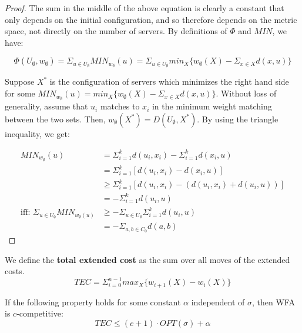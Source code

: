 \begin{proof}
    The sum in the middle of the above equation is clearly a constant that only depends on the initial configuration, and so therefore depends on the metric space, not directly on the number of servers. By definitions of $\Phi$ and $MIN$, we have:

    \begin{equation*}
        \Phi(U_\emptyset, w_\emptyset) = \Sigma_{u \in U_\emptyset} MIN_{w_\emptyset}(u) = \Sigma_{u \in U_\emptyset} min_X \{ w_\emptyset(X) - \Sigma_{x \in X} d(x, u)\}
    \end{equation*}

    Suppose $X^*$ is the configuration of servers which minimizes the right hand side for some $MIN_{w_\emptyset}(u) = min_X \{ w_\emptyset(X) - \Sigma_{x \in X} d(x, u)\}$. Without loss of generality, assume that $u_i$ matches to $x_i$ in the minimum weight matching between the two sets. Then, $w_\emptyset(X^*) = D(U_\emptyset, X^*)$. By using the triangle inequality, we get:

    \begin{equation*}
        \begin{split}
            MIN_{w_\emptyset}(u) &= \Sigma_{i=1}^k d(u_i, x_i) - \Sigma_{i=1}^k d(x_i , u) \\
            &= \Sigma_{i=1}^k [d(u_i, x_i) - d(x_i, u)] \\
            &\geq \Sigma_{i=1}^k [d(u_i, x_i) - (d(u_i, x_i) + d(u_i, u))] \\
            &= - \Sigma_{i=1}^k d(u_i, u) \\
            \text{iff: }\Sigma_{u \in U_\emptyset} MIN_{w_\emptyset(u)} &\geq -\Sigma_{u \in U_\emptyset} \Sigma_{i=1}^k d(u_i, u) \\
            &= - \Sigma_{a, b \in C_0} d(a, b)
        \end{split}
    \end{equation*}
\end{proof}

\begin{definition}
    We define the \textbf{total extended cost} as the sum over all moves of the extended costs.
    \begin{equation*}
        TEC = \Sigma_{i = 0}^{n-1} max_X \{ w_{i+1} (X) - w_i(X)\}
    \end{equation*}
\end{definition}

\begin{lemma}
    If the following property holds for some constant $\alpha$ independent of $\sigma$, then WFA is $c$-competitive:
    \begin{equation*}
        TEC \leq (c+1) \cdot  OPT(\sigma) + \alpha
    \end{equation*}
\end{lemma}

